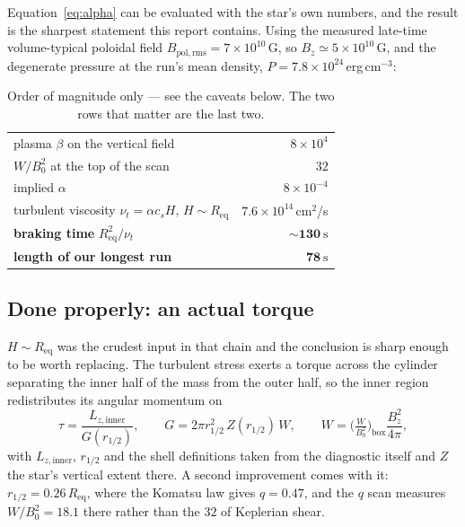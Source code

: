 \documentclass[11pt,a4paper]{article}
\newcommand{\Req}{R_{\mathrm{eq}}}
\begin{document}
Equation~\eqref{eq:alpha} can be evaluated with the star's own numbers, and the
result is the sharpest statement this report contains. Using the measured
late-time volume-typical poloidal field $B_{\mathrm{pol,rms}} = 7\times10^{10}$\,G,
so $B_z \simeq 5\times10^{10}$\,G, and the degenerate pressure at the run's mean
density, $P = 7.8\times10^{24}$\,erg\,cm$^{-3}$:

\begin{table}[h]
\centering\small
\begin{tabular}{lr}
\toprule
plasma $\beta$ on the vertical field & $8\times10^{4}$ \\
$W/B_0^2$ at the top of the scan & $32$ \\
implied $\alpha$ & $8\times10^{-4}$ \\
turbulent viscosity $\nu_t = \alpha c_s H$, $H \sim \Req$ & $7.6\times10^{14}$\,cm$^2$/s \\
\midrule
\textbf{braking time} $\Req^2/\nu_t$ & $\mathbf{\sim 130\ \mathrm{s}}$ \\
\textbf{length of our longest run} & $\mathbf{78\ \mathrm{s}}$ \\
\bottomrule
\end{tabular}
\caption{Order of magnitude only --- see the caveats below. The two rows that
matter are the last two.}
\label{tab:brake}
\end{table}

\subsection{Done properly: an actual torque}

$H \sim \Req$ was the crudest input in that chain and the conclusion is sharp
enough to be worth replacing. The turbulent stress exerts a torque across the
cylinder separating the inner half of the mass from the outer half, so the
inner region redistributes its angular momentum on
\begin{equation}
  \tau = \frac{L_{z,\mathrm{inner}}}{G(r_{1/2})},
  \qquad
  G = 2\pi r_{1/2}^2\, Z(r_{1/2})\, W,
  \qquad
  W = \Big(\tfrac{W}{B_0^2}\Big)_{\!\mathrm{box}} \frac{B_z^2}{4\pi},
\end{equation}
with $L_{z,\mathrm{inner}}$, $r_{1/2}$ and the shell definitions taken from the
diagnostic itself and $Z$ the star's vertical extent there. A second
improvement comes with it: $r_{1/2} = 0.26\,\Req$, where the Komatsu law gives
$q = 0.47$, and the $q$ scan measures $W/B_0^2 = 18.1$ there rather than the
$32$ of Keplerian shear.
\end{document}

